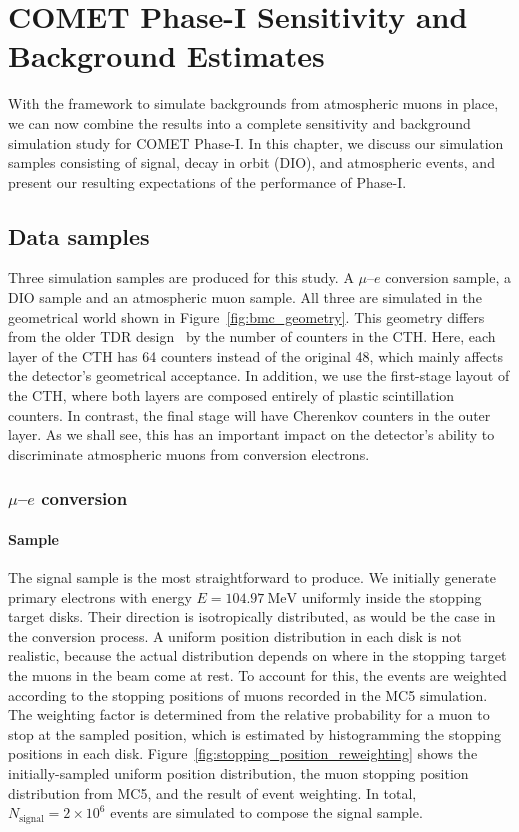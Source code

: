 \chapter{COMET Phase-I Sensitivity and Background Estimates}
\label{ch:phase-I_study}

With the framework to simulate backgrounds from atmospheric muons in place, we
can now combine the results into a complete sensitivity and background
simulation study for COMET Phase-I. In this chapter, we discuss our simulation
samples consisting of signal, decay in orbit (DIO), and atmospheric events, and
present our resulting expectations of the performance of Phase-I.

\section{Data samples}
Three simulation samples are produced for this study. A $\mu$--$e$ conversion
sample, a DIO sample and an atmospheric muon sample. All three are simulated in
the geometrical world shown in Figure~\ref{fig:bmc_geometry}. This geometry
differs from the older TDR design~\cite{the_comet_collaboration_comet_2020} by
the number of counters in the CTH. Here, each layer of the CTH has 64 counters
instead of the original 48, which mainly affects the detector's geometrical
acceptance. In addition, we use the first-stage layout of the CTH, where both
layers are composed entirely of plastic scintillation counters. In contrast, the
final stage will have Cherenkov counters in the outer layer. As we shall see,
this has an important impact on the detector's ability to discriminate
atmospheric muons from conversion electrons.

\subsection{\texorpdfstring{$\mu$--$e$}{Muon-to-electron} conversion} 

\subsubsection{Sample}

The signal sample is the most straightforward to produce. We initially generate
primary electrons with energy $E=\SI{104.97}{\MeV}$ uniformly inside the
stopping target disks. Their direction is isotropically distributed, as would be
the case in the conversion process. A uniform position distribution in each disk
is not realistic, because the actual distribution depends on where in the
stopping target the muons in the beam come at rest. To account for this, the
events are weighted according to the stopping positions of muons recorded in the
MC5 simulation. The weighting factor is determined from the relative probability
for a muon to stop at the sampled position, which is estimated by histogramming
the stopping positions in each disk.
Figure~\ref{fig:stopping_position_reweighting} shows the initially-sampled
uniform position distribution, the muon stopping position distribution from MC5,
and the result of event weighting. In total, $N_\mathrm{signal} =
2\times 10^6$ events are simulated to compose the signal sample.

